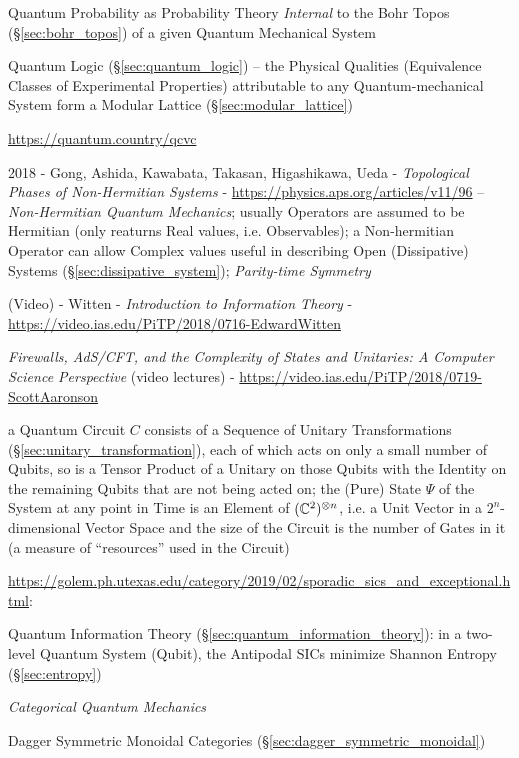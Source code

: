 Quantum Probability as Probability Theory \emph{Internal} to the Bohr Topos
(\S\ref{sec:bohr_topos}) of a given Quantum Mechanical System

Quantum Logic (\S\ref{sec:quantum_logic}) -- the Physical Qualities (Equivalence
Classes of Experimental Properties) attributable to any Quantum-mechanical
System form a Modular Lattice (\S\ref{sec:modular_lattice})

\url{https://quantum.country/qcvc}

2018 - Gong, Ashida, Kawabata, Takasan, Higashikawa, Ueda -
\emph{Topological Phases of Non-Hermitian Systems} -
\url{https://physics.aps.org/articles/v11/96} -- \emph{Non-Hermitian Quantum
  Mechanics}; usually Operators are assumed to be Hermitian (only reaturns Real
values, i.e. Observables); a Non-hermitian Operator can allow Complex values
useful in describing Open (Dissipative) Systems
(\S\ref{sec:dissipative_system}); \emph{Parity-time Symmetry}

(Video) - Witten - \emph{Introduction to Information Theory} -
\url{https://video.ias.edu/PiTP/2018/0716-EdwardWitten}

\asterism

\emph{Firewalls, AdS/CFT, and the Complexity of States and Unitaries: A Computer
  Science Perspective}
(video lectures)
-
\url{https://video.ias.edu/PiTP/2018/0719-ScottAaronson}

a Quantum Circuit $C$ consists of a Sequence of Unitary Transformations
(\S\ref{sec:unitary_transformation}), each of which acts on only a small number
of Qubits, so is a Tensor Product of a Unitary on those Qubits with the Identity
on the remaining Qubits that are not being acted on; the (Pure) State $\Psi$ of
the System at any point in Time is an Element of $(\mathbb{C}^2)^{\otimes n}$, i.e.
a Unit Vector in a $2^n$-dimensional Vector Space and the size of the Circuit is
the number of Gates in it (a measure of ``resources'' used in the Circuit)

\asterism

\url{https://golem.ph.utexas.edu/category/2019/02/sporadic_sics_and_exceptional.html}:

Quantum Information Theory (\S\ref{sec:quantum_information_theory}): in a
two-level Quantum System (Qubit), the Antipodal SICs minimize Shannon Entropy
(\S\ref{sec:entropy})

\asterism

\emph{Categorical Quantum Mechanics}

Dagger Symmetric Monoidal Categories (\S\ref{sec:dagger_symmetric_monoidal})

